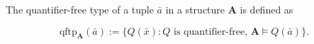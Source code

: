 The quantifier-free type of a tuple $\bar{a}$ in a structure $\mathbf{A}$ is defined as

$$\text{qftp}_{\mathbf{A}}(\bar{a}) := \{Q(\bar{x}) : Q \text{ is quantifier-free, } \mathbf{A} \vDash Q(\bar{a})\}.$$
